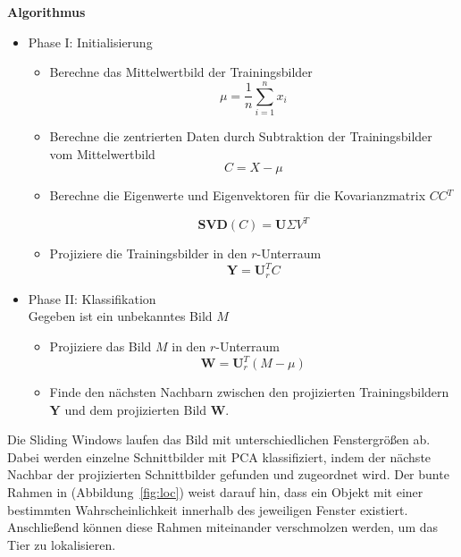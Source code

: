 \textbf{Algorithmus}
\begin{itemize}
\item{Phase I: Initialisierung}
\begin{itemize}
\item{Berechne das Mittelwertbild der Trainingsbilder}
\begin{equation}
\mu = \frac{1}{n}\sum^n_{i=1}{x_i} 
\end{equation}
\item{Berechne die zentrierten Daten durch Subtraktion der Trainingsbilder vom Mittelwertbild}
\begin{equation}
C = X - \mu
\end{equation}
\item{Berechne die Eigenwerte und Eigenvektoren für die Kovarianzmatrix $CC$$^T$}

\begin{equation}
\mathbf{SVD}(C) =\mathbf{U} \Sigma V^T 
\end{equation}
\item{Projiziere die Trainingsbilder in den $r$-Unterraum}
\begin{equation}
\mathbf{Y}=\mathbf{U}^{T}_{r}C
\end{equation}
\end{itemize}
\item{Phase II: Klassifikation}\\
Gegeben ist ein unbekanntes Bild  $M$
\begin{itemize}
\item{Projiziere das Bild $M$ in den $r$-Unterraum}
\begin{equation}
\mathbf{W}=\mathbf{U}^{T}_{r} (M - \mu)
\end{equation}
\item{Finde den nächsten Nachbarn zwischen den projizierten Trainingsbildern $\mathbf{Y}$ und dem projizierten Bild $\mathbf{W}$}.
\end{itemize}
\end{itemize}
Die Sliding Windows laufen das Bild mit unterschiedlichen Fenstergrößen ab. Dabei werden einzelne Schnittbilder mit PCA klassifiziert, indem der nächste Nachbar der projizierten Schnittbilder gefunden und zugeordnet wird. Der bunte Rahmen in (Abbildung~\ref{fig:loc}) weist darauf hin, dass ein Objekt mit einer bestimmten Wahrscheinlichkeit innerhalb des jeweiligen Fenster existiert. Anschließend können diese Rahmen miteinander verschmolzen werden, um das Tier zu lokalisieren.
